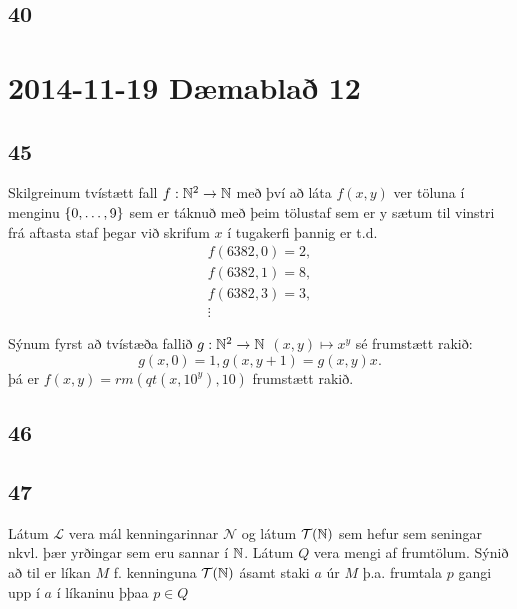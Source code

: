 \documentclass[12pt]{book}
\newcommand{\cT}{\mathcal{T}}
\newcommand{\cL}{\mathcal{L}}
\newcommand{\cN}{\mathcal{N}}
\begin{document}
\section{40}




\chapter{2014-11-19 Dæmablað 12}

\section{45}

\begin{daemi}
  Skilgreinum tvístætt fall $f: \mathbb{N}^2 \to \mathbb{N}$ með því að láta $f(x,y)$
  ver töluna í menginu $\{0,\dotsc,9\}$ sem er táknuð með þeim
  tölustaf sem er y sætum til vinstri frá aftasta staf þegar við
  skrifum $x$ í tugakerfi þannig er t.d.
  \begin{gather*}
    f(6382,0) = 2,\\
    f(6382,1) = 8,\\
    f(6382,3) = 3,\\
    \vdots
  \end{gather*}
\end{daemi}

\begin{lausn}[Áslaug]
  Sýnum fyrst að tvístæða fallið $g: \mathbb{N}^2 \to \mathbb{N}$
  $(x,y) \mapsto x^y$ sé frumstætt rakið:
  \[g(x,0) = 1, g(x,y+1) = g(x,y)x.\]
  þá er $f(x,y) = rm(qt(x,10^y),10)$
  frumstætt rakið.
\end{lausn}

\section{46}




\section{47}

\begin{daemi}
  Látum $\cL$ vera mál kenningarinnar $\cN$ og
látum $\cT(\N)$ sem hefur sem seningar nkvl. þær yrðingar sem eru sannar
í $\mathbb{N}$. Látum $Q$ vera mengi af frumtölum. Sýnið að til er líkan $M$ f.
kenninguna $\cT(\N)$ ásamt staki $a$ úr $M$ þ.a. frumtala $p$
gangi upp í $a$ í líkaninu þþaa $p \in Q$
\end{daemi}
\end{document}

